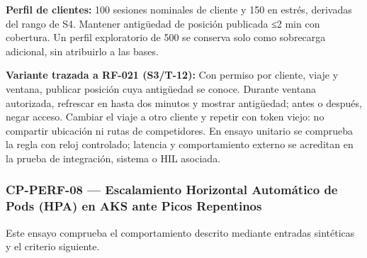 \par\noindent\textbf{Perfil de clientes:} 100 sesiones nominales de cliente y 150 en estrés, derivadas del rango de S4. Mantener antigüedad de posición publicada ≤2 min con cobertura. Un perfil exploratorio de 500 se conserva solo como sobrecarga adicional, sin atribuirlo a las bases.\par\par


\par\noindent\textbf{Variante trazada a RF-021 (S3/T-12):} Con permiso por cliente, viaje y ventana, publicar posición cuya antigüedad se conoce. Durante ventana autorizada, refrescar en hasta dos minutos y mostrar antigüedad; antes o después, negar acceso. Cambiar el viaje a otro cliente y repetir con token viejo: no compartir ubicación ni rutas de competidores. En ensayo unitario se comprueba la regla con reloj controlado; latencia y comportamiento externo se acreditan en la prueba de integración, sistema o HIL asociada.\par
\subsubsection*{CP-PERF-08 — Escalamiento Horizontal Automático de Pods (HPA) en AKS ante Picos Repentinos}\label{sec:9-cp-perf-08}
Este ensayo comprueba el comportamiento descrito mediante entradas sintéticas y el criterio siguiente.

